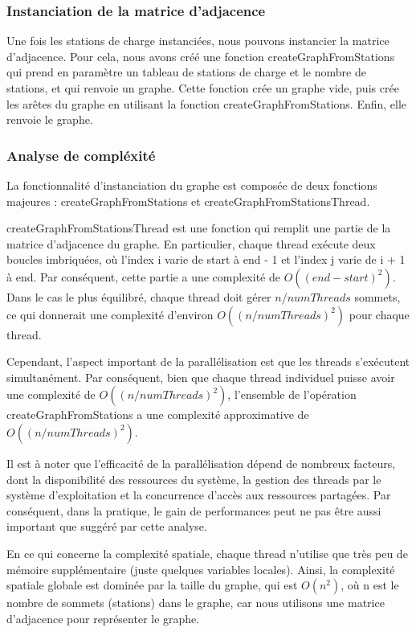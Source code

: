 \documentclass[french,a4paper]{article}
\begin{document}
    \subsubsection{Instanciation de la matrice d'adjacence}
    Une fois les stations de charge instanciées, nous pouvons instancier la matrice d'adjacence. Pour cela, nous avons créé une fonction createGraphFromStations qui prend en paramètre un tableau de stations de charge et le nombre de stations, et qui renvoie un graphe. Cette fonction crée un graphe vide, puis crée les arêtes du graphe en utilisant la fonction createGraphFromStations. Enfin, elle renvoie le graphe.

    \subsubsection{Analyse de compléxité}
    La fonctionnalité d'instanciation du graphe est composée de deux fonctions majeures : createGraphFromStations et createGraphFromStationsThread.

    createGraphFromStationsThread est une fonction qui remplit une partie de la matrice d'adjacence du graphe. En particulier, chaque thread exécute deux boucles imbriquées, où l'index i varie de start à end - 1 et l'index j varie de i + 1 à end. Par conséquent, cette partie a une complexité de $O((end-start)^2)$. Dans le cas le plus équilibré, chaque thread doit gérer $n / numThreads$ sommets, ce qui donnerait une complexité d'environ $O((n / numThreads)^2)$ pour chaque thread.

    Cependant, l'aspect important de la parallélisation est que les threads s'exécutent simultanément. Par conséquent, bien que chaque thread individuel puisse avoir une complexité de $O((n / numThreads)^2)$, l'ensemble de l'opération createGraphFromStations a une complexité approximative de $O((n / numThreads)^2)$.

    Il est à noter que l'efficacité de la parallélisation dépend de nombreux facteurs, dont la disponibilité des ressources du système, la gestion des threads par le système d'exploitation et la concurrence d'accès aux ressources partagées. Par conséquent, dans la pratique, le gain de performances peut ne pas être aussi important que suggéré par cette analyse.

    En ce qui concerne la complexité spatiale, chaque thread n'utilise que très peu de mémoire supplémentaire (juste quelques variables locales). Ainsi, la complexité spatiale globale est dominée par la taille du graphe, qui est $O(n^2)$, où n est le nombre de sommets (stations) dans le graphe, car nous utilisons une matrice d'adjacence pour représenter le graphe.
\end{document}
